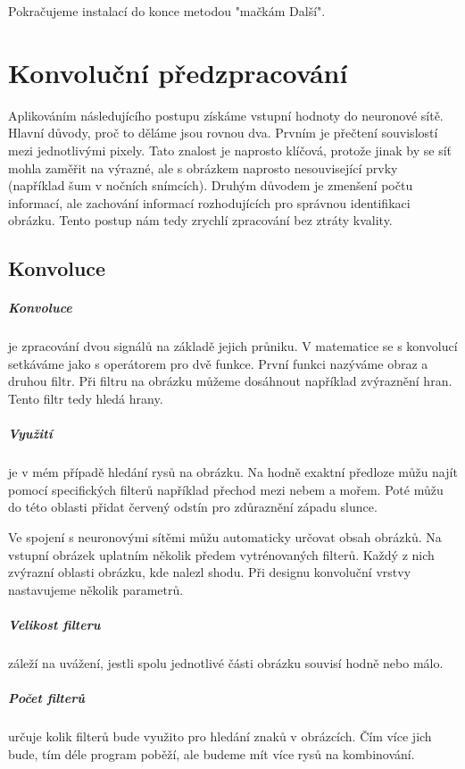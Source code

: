 \documentclass[12pt,a4paper]{report}
\begin{document}
	
	Pokračujeme instalací do konce metodou "mačkám Další".
		
\chapter{Konvoluční předzpracování}
	Aplikováním následujícího postupu získáme vstupní hodnoty do neuronové sítě. Hlavní důvody, proč to děláme jsou rovnou dva. Prvním je přečtení souvislostí mezi jednotlivými pixely. Tato znalost je naprosto klíčová, protože jinak by se síť mohla zaměřit na výrazné, ale s obrázkem naprosto nesouvisející prvky (například šum v nočních snímcích). Druhým důvodem je zmenšení počtu informací, ale zachování informací rozhodujících pro správnou identifikaci obrázku. Tento postup nám tedy zrychlí zpracování bez ztráty kvality.
	\section{Konvoluce}
		\paragraph{Konvoluce}
		je zpracování dvou signálů na základě jejich průniku. V matematice se s konvolucí setkáváme jako s operátorem pro dvě funkce. První funkci nazýváme obraz a druhou filtr. Při filtru na obrázku můžeme dosáhnout například zvýraznění hran. Tento filtr tedy hledá hrany.
		\paragraph{Využití}
		je v mém případě hledání rysů na obrázku. Na hodně exaktní předloze můžu najít pomocí specifických filterů například přechod mezi nebem a mořem. Poté můžu do této oblasti přidat červený odstín pro zdůraznění západu slunce.
		
		Ve spojení s neuronovými sítěmi můžu automaticky určovat obsah obrázků. Na vstupní obrázek uplatním několik předem vytrénovaných filterů. Každý z nich zvýrazní oblasti obrázku, kde nalezl shodu. Při designu konvoluční vrstvy nastavujeme několik parametrů.
		
		\paragraph{Velikost filteru}
		záleží na uvážení, jestli spolu jednotlivé části obrázku souvisí hodně nebo málo.
		\paragraph{Počet filterů}
		určuje kolik filterů bude využito pro hledání znaků v obrázcích. Čím více jich bude, tím déle program poběží, ale budeme mít více rysů na kombinování.
\end{document}
